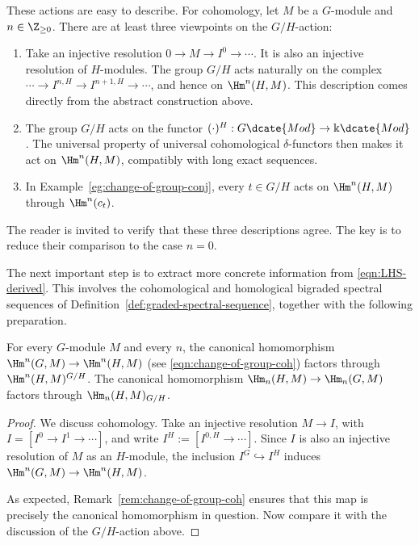 These actions are easy to describe. For cohomology, let $M$ be a $G$-module
and $n\in\Z_{\geq0}$. There are at least three viewpoints on the $G/H$-action:
\begin{enumerate}
	\item Take an injective resolution $0\to M\to I^0\to\cdots$. It is also an
	injective resolution of $H$-modules. The group $G/H$ acts naturally on the
	complex $\cdots\to I^{n,H}\to I^{n+1,H}\to\cdots$, and hence on
	$\Hm^n(H,M)$. This description comes directly from the abstract
	construction above.
	\item The group $G/H$ acts on the functor
	$(\cdot)^H:G\dcate{Mod}\to\Bbbk\dcate{Mod}$. The universal property of
	universal cohomological $\delta$-functors then makes it act on
	$\Hm^n(H,M)$, compatibly with long exact sequences.
	\item In Example~\ref{eg:change-of-group-conj}, every $t\in G/H$ acts on
	$\Hm^n(H,M)$ through $\Hm^n(c_t)$.
\end{enumerate}
The reader is invited to verify that these three descriptions agree. The key
is to reduce their comparison to the case $n=0$.

The next important step is to extract more concrete information from
\eqref{eqn:LHS-derived}. This involves the cohomological and homological
bigraded spectral sequences of Definition~\ref{def:graded-spectral-sequence},
together with the following preparation.

\begin{lemma}\label{prop:LHS-action-aux}
	For every $G$-module $M$ and every $n$, the canonical homomorphism
	$\Hm^n(G,M)\to\Hm^n(H,M)$ (see \eqref{eqn:change-of-group-coh}) factors
	through $\Hm^n(H,M)^{G/H}$. The canonical homomorphism
	$\Hm_n(H,M)\to\Hm_n(G,M)$ factors through
	$\Hm_n(H,M)_{G/H}$.
\end{lemma}
\begin{proof}
	We discuss cohomology. Take an injective resolution $M\to I$, with
	$I=[I^0\to I^1\to\cdots]$, and write
	$I^H:=[I^{0,H}\to\cdots]$. Since $I$ is also an injective resolution of
	$M$ as an $H$-module, the inclusion $I^G\hookrightarrow I^H$ induces
	$\Hm^n(G,M)\to\Hm^n(H,M)$.

	As expected, Remark~\ref{rem:change-of-group-coh} ensures that this map is
	precisely the canonical homomorphism in question. Now compare it with the
	discussion of the $G/H$-action above.
\end{proof}

